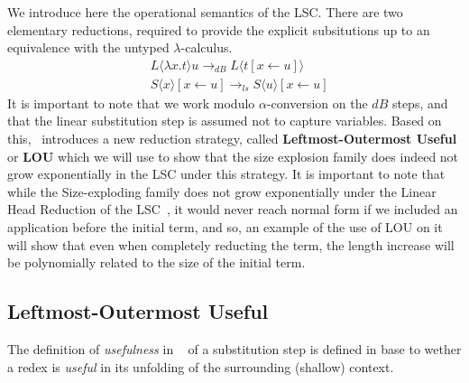 \documentclass[11pt]{article}
\begin{document}
We introduce here the operational semantics of the LSC. There are two elementary reductions, required to provide the explicit subsitutions up to an equivalence with the untyped $\lambda$-calculus.
\begin{equation}
  \begin{split}
    &L \langle \lambda x .t \rangle u \rightarrow_{dB} L \langle t [x \leftarrow u] \rangle \\
    &S \langle x \rangle [x \leftarrow u] \rightarrow_{ls} S \langle u \rangle [x \leftarrow u]
  \end{split}
\end{equation}
It is important to note that we work modulo $\alpha$-conversion on the $dB$ steps, and that the linear substitution step is assumed not to capture variables.
Based on this,~\cite{beta-invariance} introduces a new reduction strategy, called \textbf{Leftmost-Outermost Useful} or \textbf{LOU} which we will use to show that the size explosion family does indeed not grow exponentially in the LSC under this strategy. It is important to note that while the Size-exploding family does not grow exponentially under the Linear Head Reduction of the LSC~\cite{invariance-of-cost-model}, it would never reach normal form if we included an application before the initial term, and so, an example of the use of LOU on it will show that even when completely reducting the term, the length increase will be polynomially related to the size of the initial term.




\subsection{Leftmost-Outermost Useful}\label{lou}
The definition of \textit{usefulness} in ~\cite{beta-invariance} of a substitution step is defined in base to wether a redex is \textit{useful} in its unfolding of the surrounding (shallow) context.
\end{document}
